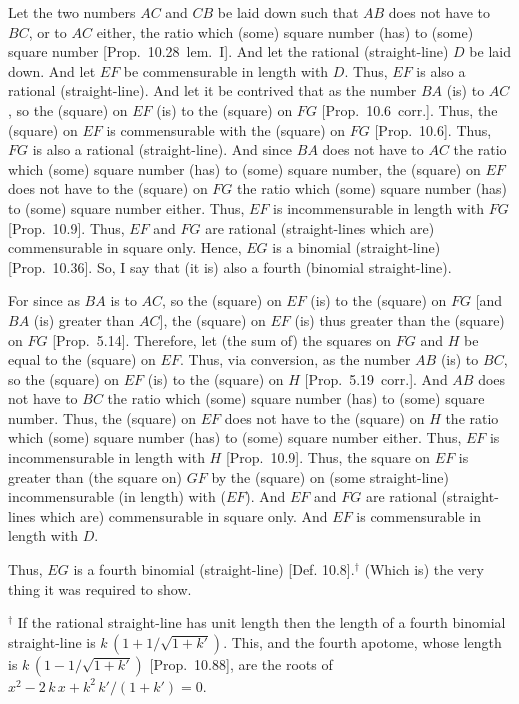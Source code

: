 \begin{Parallel}{}{}
{Let the two numbers $AC$ and $CB$ be laid down such that $AB$ does not have to $BC$,  or to $AC$ either, the ratio which (some) square number
(has) to (some) square number [Prop.~10.28~lem.~I].
And let the rational (straight-line) $D$ be laid down. And let $EF$ be
commensurable in length with $D$. Thus, $EF$ is also a rational (straight-line). And let it be contrived that as the number $BA$ (is) to
$AC$, so the (square) on $EF$ (is) to the (square) on $FG$ [Prop.~10.6~corr.]. Thus, the (square) on $EF$
is commensurable with the (square) on $FG$ [Prop.~10.6]. Thus, $FG$ is also a rational (straight-line). And since $BA$ does not have to $AC$ the ratio which (some)
square number (has) to (some) square number,  the (square) on $EF$
does not have to the (square) on $FG$ the ratio which (some) square number
(has) to (some) square number either. Thus, $EF$ is incommensurable in length with $FG$ [Prop.~10.9]. Thus, $EF$ and
$FG$ are rational (straight-lines which are) commensurable in square only.
Hence, $EG$ is a binomial (straight-line) [Prop.~10.36]. So, I say that (it is) also
a fourth (binomial straight-line).

For since as $BA$ is to $AC$, so the (square) on $EF$ (is) to the (square) on
$FG$ [and $BA$ (is) greater than $AC$], the (square) on $EF$ (is) thus
greater than the (square) on $FG$ [Prop.~5.14]. Therefore, let (the sum of) the squares on
$FG$ and $H$ be equal to the (square) on $EF$. Thus, via conversion,
as the number $AB$ (is) to $BC$, so the (square) on $EF$ (is) to the
(square) on $H$ [Prop.~5.19~corr.]. And $AB$
does not have to $BC$ the ratio which (some) square number (has) to (some)
square number. Thus, the (square) on $EF$ does not have to the
(square) on $H$ the ratio which (some) square number (has) to (some) square
number either. Thus, $EF$ is incommensurable in length with $H$ [Prop.~10.9]. Thus, the square on $EF$ is greater than (the square on) $GF$ by the (square) on (some straight-line)
incommensurable (in length) with ($EF$). And $EF$ and $FG$ are rational (straight-lines which are) commensurable in square only.  And $EF$ is commensurable
in length with $D$.

Thus, $EG$ is a fourth binomial (straight-line) [Def. 10.8].$^\dag$ (Which is) the very thing
it was required to show.}
\end{Parallel}
{\footnotesize\noindent $^\dag$ If the rational straight-line has unit length then the length of a fourth binomial straight-line
is  $k\,(1+1/\sqrt{1+k'})$. This, and the fourth apotome,
whose length is $k\,(1-1/\sqrt{1+k'})$ [Prop.~10.88],
are the roots of $x^2- 2\,k\,x+k^2\,k'/(1+k')=0$.}

